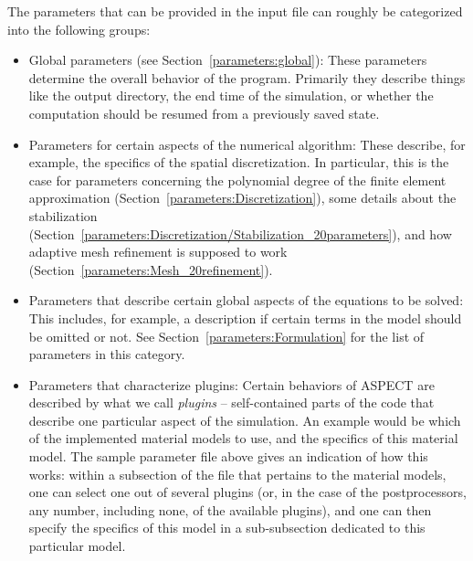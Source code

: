 \documentclass{article}
\newcommand{\aspect}{\textsc{ASPECT}}
\begin{document}
The parameters that can be provided in the input file can roughly be
categorized into the following groups:
\begin{itemize}
\item Global parameters (see Section~\ref{parameters:global}): These
  parameters determine the overall behavior of the program. Primarily they
  describe things like the output directory, the end time of the simulation,
  or whether the computation should be resumed from a previously saved state.

\item Parameters for certain aspects of the numerical algorithm: These
  describe, for example, the specifics of the spatial discretization. In
  particular, this is the case for parameters concerning
  the polynomial degree of the finite element approximation
  (Section~\ref{parameters:Discretization}), some details about the
  stabilization
  (Section~\ref{parameters:Discretization/Stabilization_20parameters}), and
  how adaptive mesh refinement is supposed to work
  (Section~\ref{parameters:Mesh_20refinement}).

\item Parameters that describe certain global aspects of the equations to be
  solved: This includes, for example, a description if certain terms in the
  model should be omitted or not. See
  Section~\ref{parameters:Formulation} for the list of parameters in this
  category.

\item Parameters that characterize plugins: Certain behaviors of
  \aspect{} are described by what we call \textit{plugins} -- self-contained
  parts of the code that describe one particular aspect of the simulation. An
  example would be which of the implemented material models to use, and the
  specifics of this material model. The sample parameter file above gives an
  indication of how this works: within a subsection of the file that pertains
  to the material models, one can select one out of several plugins (or, in
  the case of the postprocessors, any number, including none, of the available
  plugins), and one can then specify the specifics of this model in a
  sub-subsection dedicated to this particular model.


\end{itemize}
\end{document}

